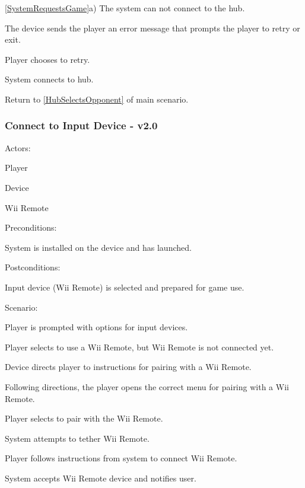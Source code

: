 \documentclass[12pt]{article}
\newenvironment{itemize*}%
  {\begin{itemize}%
  	\setlength{\parsep}{0pt}
    \setlength{\itemsep}{0pt}%
    \setlength{\parskip}{0pt}}%
  {\end{itemize}}
\newenvironment{enumerate*}%
  {\begin{enumerate}%
  	\setlength{\parsep}{0pt}
    \setlength{\itemsep}{0pt}%
    \setlength{\parskip}{0pt}}%
  {\end{enumerate}}
\begin{document}
\ref{SystemRequestsGame}a) The system can not connect to the hub.
\begin{enumerate*}
\item The device sends the player an error message that prompts the player 
  to retry or exit.
\item Player chooses to retry.
\item System connects to hub.
\item Return to \ref{HubSelectsOpponent} of main scenario.
\end{enumerate*}

\subsubsection*{Connect to Input Device - v2.0}
Actors:
\begin{itemize*}
\item Player
\item Device 
\item Wii Remote
\end{itemize*}
Preconditions:
\begin{itemize*}
\item System is installed on the device and has launched.
\end{itemize*}
Postconditions:
\begin{itemize*}
\item Input device (Wii Remote) is selected and prepared for game use.
\end{itemize*}
Scenario:
\begin{enumerate*}
\item Player is prompted with options for input devices.
\item \label{SelectInput} Player selects to use a Wii Remote, but Wii Remote
is not connected yet.
\item \label{PromptToConnect} Device directs player to instructions for 
pairing with a Wii Remote.
\item \label{MenuToWii}Following directions, the player opens the correct 
menu for pairing with a Wii Remote.
\item Player selects to pair with the Wii Remote.
\item \label{ConnectWiimote}System attempts to tether Wii Remote.
\item Player follows instructions from system to connect Wii Remote.
\item System accepts Wii Remote device and notifies user.
\end{enumerate*}
\end{document}
